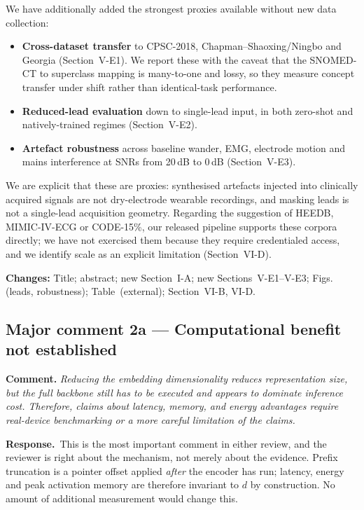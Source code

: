 \documentclass[11pt,a4paper]{article}
\newcommand{\comment}[1]{\par\medskip\noindent\textcolor{revblue}{\textbf{Comment.} \textit{#1}}\par\smallskip}
\newcommand{\response}{\par\noindent\textbf{Response.}\ }
\newcommand{\changed}[1]{\par\smallskip\noindent\textbf{Changes:} #1\par}
\begin{document}
We have additionally added the strongest proxies available without new data
collection:
\begin{itemize}[leftmargin=*,itemsep=2pt]
\item \textbf{Cross-dataset transfer} to CPSC-2018, Chapman--Shaoxing/Ningbo
and Georgia (Section~V-E1). We report these with the caveat that the
SNOMED-CT to superclass mapping is many-to-one and lossy, so they measure
concept transfer under shift rather than identical-task performance.
\item \textbf{Reduced-lead evaluation} down to single-lead input, in both
zero-shot and natively-trained regimes (Section~V-E2).
\item \textbf{Artefact robustness} across baseline wander, EMG, electrode
motion and mains interference at SNRs from 20\,dB to 0\,dB (Section~V-E3).
\end{itemize}

We are explicit that these are proxies: synthesised artefacts injected into
clinically acquired signals are not dry-electrode wearable recordings, and
masking leads is not a single-lead acquisition geometry. Regarding the
suggestion of HEEDB, MIMIC-IV-ECG or CODE-15\%, our released pipeline supports
these corpora directly; we have not exercised them because they require
credentialed access, and we identify scale as an explicit limitation
(Section~VI-D).

\changed{Title; abstract; new Section~I-A; new Sections~V-E1--V-E3;
Figs. (leads, robustness); Table~(external); Section~VI-B, VI-D.}

\subsection*{Major comment 2a --- Computational benefit not established}

\comment{Reducing the embedding dimensionality reduces representation size,
but the full backbone still has to be executed and appears to dominate
inference cost. Therefore, claims about latency, memory, and energy advantages
require real-device benchmarking or a more careful limitation of the claims.}

\response This is the most important comment in either review, and the
reviewer is right about the mechanism, not merely about the evidence. Prefix
truncation is a pointer offset applied \emph{after} the encoder has run;
latency, energy and peak activation memory are therefore invariant to $d$ by
construction. No amount of additional measurement would change this.
\end{document}

